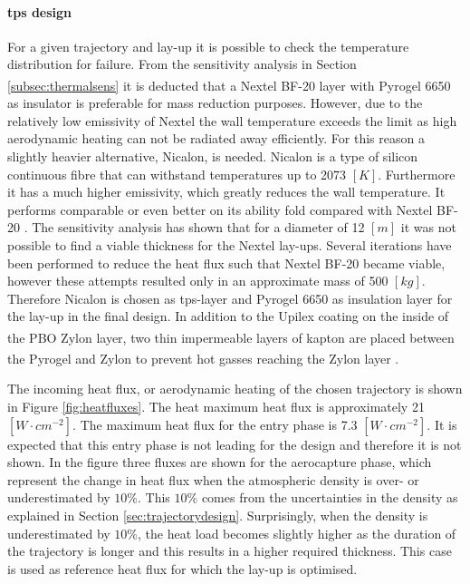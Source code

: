 \paragraph{\acrlong{tps} design}
For a given trajectory and lay-up it is possible to check the temperature distribution for failure. From the sensitivity analysis in Section \ref{subsec:thermalsens} it is deducted that a Nextel BF-20 layer with Pyrogel\textsuperscript{\textregistered} 6650 as insulator is preferable for mass reduction purposes. However, due to the relatively low emissivity of Nextel the wall temperature exceeds the limit as high aerodynamic heating can not be radiated away efficiently. For this reason a slightly heavier alternative, Nicalon, is needed. Nicalon is a type of silicon continuous fibre that can withstand temperatures up to 2073 $\left[K\right]$. Furthermore it has a much higher emissivity, which greatly reduces the wall temperature. It performs comparable or even better on its ability fold compared with Nextel BF-20 \cite{Corso2011}. The sensitivity analysis has shown that for a diameter of 12 $\left[m\right]$ it was not possible to find a viable thickness for the Nextel lay-ups. Several iterations have been performed to reduce the heat flux such that Nextel BF-20 became viable, however these attempts resulted only in an approximate mass of 500 $\left[kg\right]$. Therefore Nicalon is chosen as \gls{tps}-layer and Pyrogel 6650 as insulation layer for the lay-up in the final design. In addition to the Upilex coating on the inside of the PBO Zylon\textsuperscript{\textregistered} layer, two thin impermeable layers of kapton are placed between the Pyrogel\textsuperscript{\textregistered} and Zylon\textsuperscript{\textregistered} to prevent hot gasses reaching the Zylon\textsuperscript{\textregistered} layer \cite{Hughes2005,Litton2011}.

The incoming heat flux, or aerodynamic heating of the chosen trajectory is shown in Figure \ref{fig:heatfluxes}. The heat maximum heat flux is approximately 21 $\left[W\cdot cm^{-2}\right]$. The maximum heat flux for the entry phase is 7.3 $\left[W\cdot cm^{-2}\right]$. It is expected that this entry phase is not leading for the design and therefore it is not shown. In the figure three fluxes are shown for the aerocapture phase, which represent the change in heat flux when the atmospheric density is over- or underestimated by $10\%$. This $10\%$ comes from the uncertainties in the density as explained in Section \ref{sec:trajectorydesign}. Surprisingly, when the density is underestimated by $10\%$, the heat load becomes slightly higher as the duration of the trajectory is longer and this results in a higher required thickness. This case is used as reference heat flux for which the lay-up is optimised.

